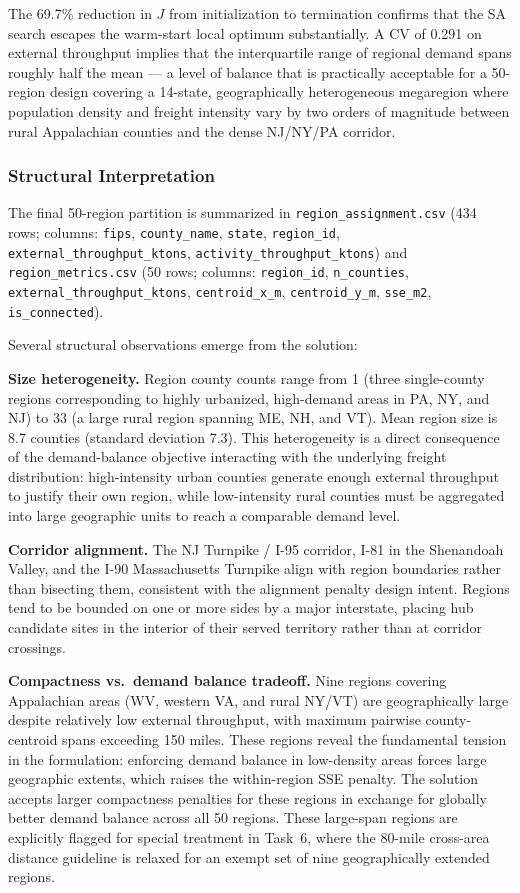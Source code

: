 The 69.7\% reduction in $J$ from initialization to termination confirms that the SA search
escapes the warm-start local optimum substantially. A CV of 0.291 on external throughput
implies that the interquartile range of regional demand spans roughly half the mean --- a
level of balance that is practically acceptable for a 50-region design covering a 14-state,
geographically heterogeneous megaregion where population density and freight intensity vary
by two orders of magnitude between rural Appalachian counties and the dense NJ/NY/PA
corridor.

\subsubsection{Structural Interpretation}

The final 50-region partition is summarized in \texttt{region\_assignment.csv} (434 rows;
columns: \texttt{fips}, \texttt{county\_name}, \texttt{state}, \texttt{region\_id},
\texttt{external\_throughput\_ktons}, \texttt{activity\_throughput\_ktons}) and
\texttt{region\_metrics.csv} (50 rows; columns: \texttt{region\_id}, \texttt{n\_counties},
\texttt{external\_throughput\_ktons}, \texttt{centroid\_x\_m}, \texttt{centroid\_y\_m},
\texttt{sse\_m2}, \texttt{is\_connected}).

Several structural observations emerge from the solution:

\textbf{Size heterogeneity.} Region county counts range from 1 (three single-county regions
corresponding to highly urbanized, high-demand areas in PA, NY, and NJ) to 33 (a large rural
region spanning ME, NH, and VT). Mean region size is 8.7 counties (standard deviation 7.3).
This heterogeneity is a direct consequence of the demand-balance objective interacting with
the underlying freight distribution: high-intensity urban counties generate enough external
throughput to justify their own region, while low-intensity rural counties must be aggregated
into large geographic units to reach a comparable demand level.

\textbf{Corridor alignment.} The NJ Turnpike / I-95 corridor, I-81 in the Shenandoah
Valley, and the I-90 Massachusetts Turnpike align with region boundaries rather than
bisecting them, consistent with the alignment penalty design intent. Regions tend to be
bounded on one or more sides by a major interstate, placing hub candidate sites in the
interior of their served territory rather than at corridor crossings.

\textbf{Compactness vs.\ demand balance tradeoff.} Nine regions covering Appalachian areas
(WV, western VA, and rural NY/VT) are geographically large despite relatively low external
throughput, with maximum pairwise county-centroid spans exceeding 150 miles. These regions
reveal the fundamental tension in the formulation: enforcing demand balance in low-density
areas forces large geographic extents, which raises the within-region SSE penalty. The
solution accepts larger compactness penalties for these regions in exchange for globally
better demand balance across all 50 regions. These large-span regions are explicitly flagged
for special treatment in Task~6, where the 80-mile cross-area distance guideline is relaxed
for an exempt set of nine geographically extended regions.

